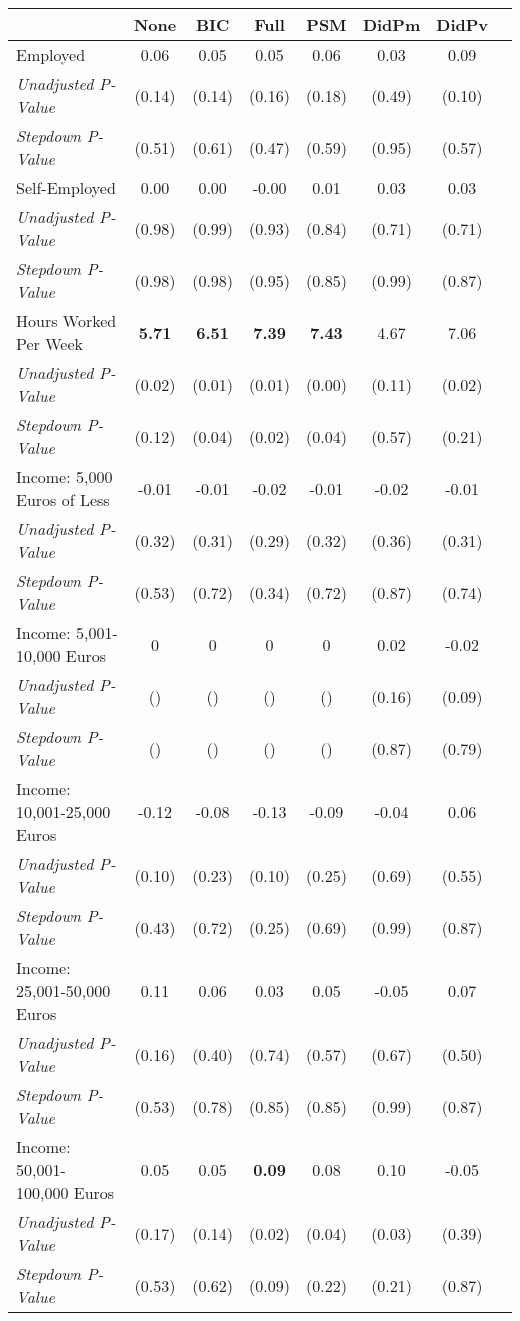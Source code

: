 \begin{tabular}{l c c c c c c c}
\toprule
 & None & BIC & Full & PSM & DidPm & DidPv \\
\midrule
Employed & 0.06 & 0.05 & 0.05 & 0.06 & 0.03 & 0.09 \\
\quad \textit{Unadjusted P-Value} & (0.14) & (0.14) & (0.16) & (0.18) & (0.49) & (0.10) \\
\quad \textit{Stepdown P-Value} & (0.51) & (0.61) & (0.47) & (0.59) & (0.95) & (0.57) \\
Self-Employed & 0.00 & 0.00 & -0.00 & 0.01 & 0.03 & 0.03 \\
\quad \textit{Unadjusted P-Value} & (0.98) & (0.99) & (0.93) & (0.84) & (0.71) & (0.71) \\
\quad \textit{Stepdown P-Value} & (0.98) & (0.98) & (0.95) & (0.85) & (0.99) & (0.87) \\
Hours Worked Per Week & \textbf{ 5.71 } & \textbf{ 6.51 } & \textbf{ 7.39 } & \textbf{ 7.43 } & 4.67 & 7.06 \\
\quad \textit{Unadjusted P-Value} & (0.02) & (0.01) & (0.01) & (0.00) & (0.11) & (0.02) \\
\quad \textit{Stepdown P-Value} & (0.12) & (0.04) & (0.02) & (0.04) & (0.57) & (0.21) \\
Income: 5,000 Euros of Less & -0.01 & -0.01 & -0.02 & -0.01 & -0.02 & -0.01 \\
\quad \textit{Unadjusted P-Value} & (0.32) & (0.31) & (0.29) & (0.32) & (0.36) & (0.31) \\
\quad \textit{Stepdown P-Value} & (0.53) & (0.72) & (0.34) & (0.72) & (0.87) & (0.74) \\
Income: 5,001-10,000 Euros & 0 & 0 & 0 & 0 & 0.02 & -0.02 \\
\quad \textit{Unadjusted P-Value} & () & () & () & () & (0.16) & (0.09) \\
\quad \textit{Stepdown P-Value} & () & () & () & () & (0.87) & (0.79) \\
Income: 10,001-25,000 Euros & -0.12 & -0.08 & -0.13 & -0.09 & -0.04 & 0.06 \\
\quad \textit{Unadjusted P-Value} & (0.10) & (0.23) & (0.10) & (0.25) & (0.69) & (0.55) \\
\quad \textit{Stepdown P-Value} & (0.43) & (0.72) & (0.25) & (0.69) & (0.99) & (0.87) \\
Income: 25,001-50,000 Euros & 0.11 & 0.06 & 0.03 & 0.05 & -0.05 & 0.07 \\
\quad \textit{Unadjusted P-Value} & (0.16) & (0.40) & (0.74) & (0.57) & (0.67) & (0.50) \\
\quad \textit{Stepdown P-Value} & (0.53) & (0.78) & (0.85) & (0.85) & (0.99) & (0.87) \\
Income: 50,001-100,000 Euros & 0.05 & 0.05 & \textbf{ 0.09 } & 0.08 & 0.10 & -0.05 \\
\quad \textit{Unadjusted P-Value} & (0.17) & (0.14) & (0.02) & (0.04) & (0.03) & (0.39) \\
\quad \textit{Stepdown P-Value} & (0.53) & (0.62) & (0.09) & (0.22) & (0.21) & (0.87) \\
\bottomrule
\end{tabular}
